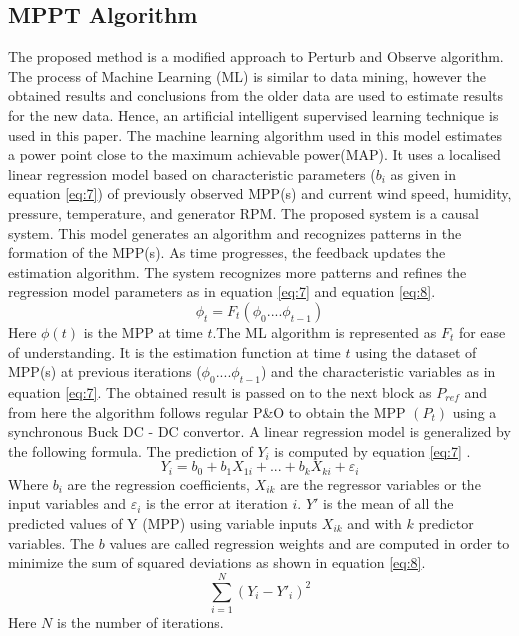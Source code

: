 \subsection{MPPT Algorithm}
The proposed method is a modified approach to Perturb and Observe algorithm. The process of Machine Learning (ML) is similar to data mining, however the obtained results and conclusions from the older data are used to estimate results for the new data. Hence, an artificial intelligent supervised learning technique is used in this paper. The machine learning algorithm used in this model estimates a power point close to the maximum achievable power(MAP). It uses a localised linear regression model based on characteristic parameters ($b_i$ as given in equation \ref{eq:7}) of previously observed MPP(s) and current wind speed, humidity, pressure, temperature, and generator RPM. The proposed system is a causal system. This model generates an algorithm and recognizes patterns in the formation of the MPP(s). As time progresses, the feedback updates the estimation algorithm. The system recognizes more patterns and refines the regression model parameters as in equation \ref{eq:7} and equation \ref{eq:8}. 
\begin{equation} \label{eq:6}
\phi_t =F_t( \phi_0 .... \phi_{t-1}) 
\end{equation}
Here $\phi(t)$ is the MPP at time $t$.The ML algorithm is represented as $F_t$  for ease of understanding. It is the estimation function at time $t$ using the dataset of MPP(s) at previous iterations ($ \phi_0 .... \phi_{t-1}$) and the characteristic variables as in equation \ref{eq:7}. The obtained result is passed on to the next block as $ P_{ref}$ and from here the algorithm follows regular P\&O to obtain the MPP $(P_t)$ using a synchronous Buck DC - DC convertor. A linear regression model is generalized by the following formula. The prediction of $Y_i$ is computed by equation \ref{eq:7} \cite{RefJ15}.
\begin{equation} \label{eq:7}
Y_i= b_0 + b_1 X_{1i} + ... + b_k X_{ki} + \varepsilon_i 
\end{equation}
Where $b_i$ are the regression coefficients, $X_{ik}$ are the regressor variables or the input variables and $\varepsilon_i$ is the error at iteration $i$.  $Y'$ is the mean of all the predicted values of Y (MPP) using variable inputs $ X_{ik}$ and with $ k$ predictor variables. The $b$ values are called regression weights and are computed in order to minimize the sum of squared deviations as shown in equation \ref{eq:8}.
\begin{equation} \label{eq:8}
\sum_{i= 1 }^{N} (Y_i - Y'_i)^2
\end{equation}
Here $N$ is the number of iterations. 
